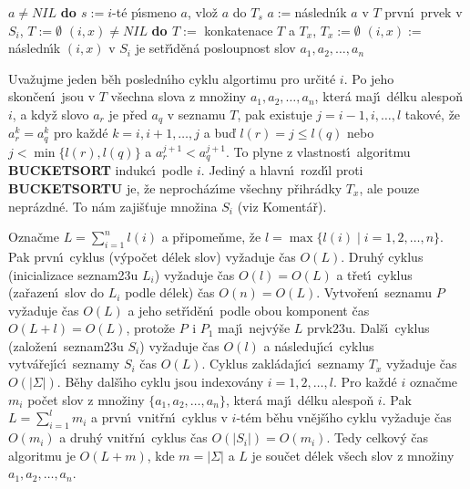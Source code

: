 \phantom{---}{\bf while} $a\ne NIL$ {\bf do\newline 
\phantom{{\rm------}}$s:=i$}-t\'e p\'\i smeno $a$, vlo\v z $a$ do $
T_s$\newline 
\phantom{------}$a:=$n\'asledn\'\i k $a$ v $T$\newline 
{}prvn\'\i\ prvek v $S_i$, $T:=\emptyset$\newline 
\phantom{---}{\bf while} $(i,x)\ne NIL$ {\bf do\newline 
\phantom{{\rm------}}$T:=$} konkatenace $T$ a $T_x$, $T_x:=\emptyset$\newline 
\phantom{------}$(i,x):=$n\'asledn\'\i k $(i,x)$ v $S_i$\newline 
{} je set\v r\'\i d\v en\'a posloupnost slov $a_1,a_2
,\dots,a_n$
\bigskip

\flushpar Uva\v zujme jeden b\v eh posledn\'\i ho cyklu algortimu 
pro ur\v cit\'e $i$. Po 
jeho skon\v cen\'\i\ jsou v $T$ v\v sechna slova z mno\v ziny 
$a_1,a_2,\dots,a_n$, kter\'a maj\'\i\ d\'elku alespo\v n $i$, a kdy\v z slovo 
$a_r$ je p\v red $a_q$ v seznamu $T$, pak existuje $j=i-1,i,\dots
,l$
takov\'e, \v ze $a^k_r=a^k_q$ pro ka\v zd\'e $k=i,i+1,\dots,j$ a bu\v d 
$l(r)=j\le l(q)$ nebo $j<\min\{l(r),l(q)\}$ a $a_r^{j+1}<a_q^{j+1}$. To plyne z 
vlastnost\'\i\ algoritmu {\bf BUCKETSORT} indukc\'\i\ podle $i$. Jedin\'y a 
hlavn\'\i\ rozd\'\i l proti {\bf BUCKETSORTU} je, \v ze neproch\'az\'\i me 
v\v sechny p\v rihr\'adky $T_x$, ale pouze nepr\'azdn\'e. 
To n\'am zaji\v s\v tuje mno\v zina $S_i$ (viz Koment\'a\v r). 
\medskip

\flushpar Ozna\v cme $L=\sum_{i=1}^nl(i)$ a p\v ripome\v nme, \v ze 
$l=\max\{l(i)\mid i=1,2,\dots,n\}$. Pak prvn\'\i\ cyklus (v\'ypo\v cet  
d\'elek slov) vy\-\v zaduje \v cas $O(L)$. Druh\'y cyklus (inicializace 
seznam\accent23u $L_i$) vy\v zaduje 
\v cas $O(l)=O(L)$ a t\v ret\'\i\ cyklus (za\v razen\'\i\ slov do $
L_i$ podle 
d\'elek) \v cas $O(n)=O(L)$. Vytvo\v ren\'\i\ 
seznamu $P_{}$ vy\v zaduje \v cas $O(L)$ a jeho set\v r\'\i d\v en\'\i\ podle obou 
komponent  
\v cas $O(L+l)=O(L)$, proto\v ze $P_{}$ i $P_1$ maj\'\i\ nejv\'y\v se $
L$ 
prvk\accent23u. Dal\v s\'\i\ cyklus (zalo\v zen\'\i\ seznam\accent23u 
$S_i$) vy\v zaduje \v cas $O(l)$ a n\'asleduj\'\i c\'\i\ cyklus vytv\'a\v rej\'\i c\'\i\ 
seznamy $S_i$ \v cas $O(L)$. Cyklus zakl\'adaj\'\i c\'\i\ 
seznamy $T_x$ vy\v zaduje \v cas $O(|\Sigma |)$. B\v ehy dal\v s\'\i ho cyklu jsou 
indexov\'any $i=1,2,\dots,l$. Pro ka\v zd\'e $i$ ozna\v cme $m_i$ po\v cet slov z 
mno\v ziny $\{a_1,a_2,\dots,a_n\}$, kter\'a maj\'\i\ d\'elku alespo\v n $
i$. Pak 
$L=\sum_{i=1}^lm_i$ a prvn\'\i\ vnit\v rn\'\i\ cyklus v $i$-t\'em b\v ehu vn\v ej\v s\'\i ho 
cyklu vy\v zaduje \v cas $O(m_i)$ a druh\'y vnit\v rn\'\i\ cyklus 
\v cas $O(|S_i|)=O(m_i)$. Tedy 
celkov\'y \v cas algoritmu je $O(L+m)$, kde $m=|\Sigma |$ a $L$ 
je sou\v cet d\'elek v\v sech slov z mno\v ziny $a_1,a_2,\dots,a_
n$.
\bigskip

